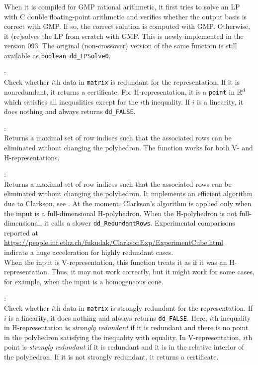 \documentclass[11pt]{article}
\newcommand {\0} {{\bf 0}}
\newcommand{\R}{{\Bbb R}}
\begin{document}
\begin{description}
When it is compiled for GMP rational
arithmetic, it first tries to solve an LP with C  double
floating-point arithmetic and verifies whether the output
basis is correct with GMP.  If so, the correct solution is
computed with GMP.  Otherwise, it (re)solves the LP
from scratch with GMP.   This is newly implemented
in the version 093.  The original (non-crossover) version of
the same function is still  available as {\tt boolean dd\_LPSolve0}.

\item[{\tt dd\_boolean dd\_Redundant(matrix, i, point, err)}]:\\
Check whether $i$th data in {\tt matrix} is redundant for the representation.
If it is nonredundant, it returns a certificate.  For H-representation,
it is a {\tt point} in $\R^d$ which satisfies
all inequalities except for the $i$th inequality.  If $i$ is a linearity,
it does nothing and always returns {\tt dd\_FALSE}.

\item[{\tt dd\_rowset dd\_RedundantRows(matrix, err)}]:\\
Returns a maximal set of row indices such that the associated rows
can be eliminated without changing the polyhedron.
The function works for both V- and H-representations.

\item[{\tt dd\_rowset dd\_RedundantRowsViaShooting(matrix, err) }]:\\
Returns a maximal set of row indices such that the associated rows
can be eliminated without changing the polyhedron.  It implements
an efficient algorithm due to Clarkson, see \cite[Chapter 7]{f-pc-20}.
At the moment, Clarkson's algorithm is applied only when the input is 
a full-dimensional H-polyhedron.  When the H-polyhedron is not full-dimensional,
 it calls a slower {\tt dd\_RedundantRows}.
Experimental comparisons reported at\\
\url{https://people.inf.ethz.ch/fukudak/ClarksonExp/ExperimentCube.html}\\
indicate a huge acceleration for highly redundant cases. \\When the input is V-representation,
this function treats it as if it was an H-representation.  Thus, it may not work correctly, but 
it might work for some cases,
for example, when the input is a homogeneous cone.


\item[{\tt dd\_boolean dd\_SRedundant(matrix, i, point, err)}]:\\
Check whether $i$th data in {\tt matrix} is strongly redundant for the representation.
If $i$ is a linearity, it does nothing and always returns {\tt dd\_FALSE}.
Here,  $i$th inequality in H-representation is {\em strongly redundant\/} if it is redundant
and there is no point in the polyhedron satisfying the inequality with equality.
In V-representation,  $i$th point is {\em strongly redundant\/} if it is redundant
and it is in the relative interior of the polyhedron. If it is not strongly redundant, it returns a certificate.


\end{description}
\end{document}
